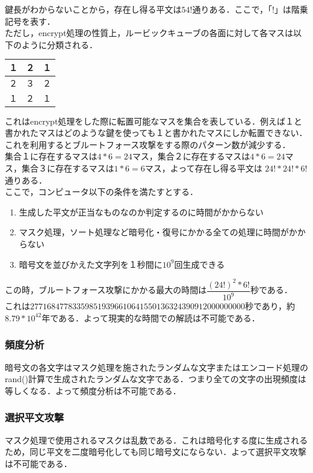 \documentclass{jsarticle}
\begin{document}
鍵長がわからないことから，存在し得る平文は$54!$通りある．ここで，「$!$」は階乗記号を表す．\\
ただし，encrypt処理の性質上，ルービックキューブの各面に対して各マスは以下のように分類される．
\begin{table}[htb]
  \begin{tabular}{|l|c|r|} \hline
    １ & ２ & １ \\ \hline
    ２ & ３ & ２ \\ \hline
    １ & ２ & １ \\ \hline
  \end{tabular}
\end{table}
これはencrypt処理をした際に転置可能なマスを集合を表している．例えば１と書かれたマスはどのような鍵を使っても１と書かれたマスにしか転置できない．これを利用するとブルートフォース攻撃をする際のパターン数が減少する．\\
集合１に存在するマスは$4*6=24$マス，集合２に存在するマスは$4*6=24$マス，集合３に存在するマスは$1*6=6$マス，よって存在し得る平文は $24!*24!*6!$通りある．\\
ここで，コンピュータ以下の条件を満たすとする．
\begin{enumerate}
  \item 生成した平文が正当なものなのか判定するのに時間がかからない
  \item マスク処理，ソート処理など暗号化・復号にかかる全ての処理に時間がかからない
  \item 暗号文を並びかえた文字列を１秒間に$10^9$回生成できる
\end{enumerate}
この時，ブルートフォース攻撃にかかる最大の時間は$\dfrac{(24!)^2*6!}{10^9}$秒である．\\
これは$277168477833598519396610641550136324390912000000000$秒であり，約$8.79*10^{42}$年である．よって現実的な時間での解読は不可能である．

\subsubsection{頻度分析}
暗号文の各文字はマスク処理を施されたランダムな文字またはエンコード処理のrand()計算で生成されたランダムな文字である．つまり全ての文字の出現頻度は等しくなる．よって頻度分析は不可能である．
\subsubsection{選択平文攻撃}
マスク処理で使用されるマスクは乱数である．これは暗号化する度に生成されるため，同じ平文を二度暗号化しても同じ暗号文にならない．よって選択平文攻撃は不可能である．
\end{document}
